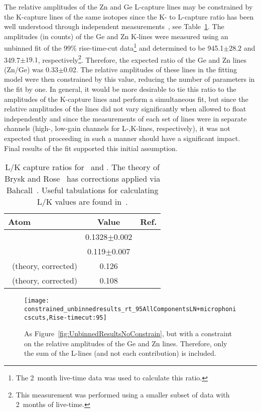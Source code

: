 The relative amplitudes of the Zn and Ge L-capture lines may be constrained by
the K-capture lines of the same isotopes since the K- to L-capture ratio has
been well understood through independent
measurements~\cite{Schonfeld1994955,Ocampo1962}, see Table~\ref{tab:LKRatios}.
The amplitudes (in counts) of the Ge and Zn K-lines were measured using an
unbinned fit of the 99\% rise-time-cut data\footnote{The 2~month live-time data
was used to calculate this ratio.} and determined to be 945.1$\pm28.2$ and
349.7$\pm19.1$, respectively\footnote{This measurement was performed using a
smaller subset of data with 2~months of live-time.}.  Therefore, the expected
ratio of the Ge and Zn lines (Zn/Ge) was 0.33$\pm$0.02.  The relative
amplitudes of these lines in the fitting model were then constrained by this
value, reducing the number of parameters in the fit by one.  In general, it
would be more desirable to tie this ratio to the amplitudes of the K-capture
lines and perform a simultaneous fit, but since the relative amplitudes of the
lines did not vary significantly when allowed to float independently and since
the measurements of each set of lines were in separate channels (high-,
low-gain channels for L-,K-lines, respectively), it was not expected that
proceeding in such a manner should have a significant impact.  Final results of
the fit supported this initial assumption.
	
			\begin{table}
				\centering
				\begin{tabular}{lcr}
					\toprule
					Atom & Value & Ref.\\
					\midrule
					\gersixeight & 0.1328$\pm$0.002 & \cite{Schonfeld1994955}\\
					\znsixfive & 0.119$\pm$0.007 & \cite{Ocampo1962}\\
					\gersixeight~(theory, corrected) & 0.126 & \cite{Bry58,Bah63} \\
					\znsixfive~(theory, corrected) & 0.108 & \cite{Bry58,Bah63} \\
					\bottomrule
				\end{tabular}	
				\caption[L/K capture ratios for \gersixeight~and \znsixfive]
				{L/K capture ratios for \gersixeight~and \znsixfive.  The theory of Brysk and Rose~\cite{Bry58}
				has corrections applied via Bahcall~\cite{Bah63}.  
				Useful tabulations for calculating L/K values are found in~\cite{Wap59}.}
				\label{tab:LKRatios}
			\end{table}
			
			\begin{figure}
				\centering				
				\texttt{[image: constrained\_unbinnedresults\_rt\_95AllComponentsLN+microphonicscuts,Rise-timecut:95]}				
				\caption[Unbinned fit results, constraints on relative amplitude of Ge and Zn lines]
				{As Figure~\ref{fig:UnbinnedResultsNoConstrain}, but with a constraint on the relative amplitudes 
				of the Ge and Zn lines.  Therefore, only the sum of the L-lines (and not each contribution) is included.  }
				\label{fig:UnBinnedResultsConstrain}
			\end{figure}
					
